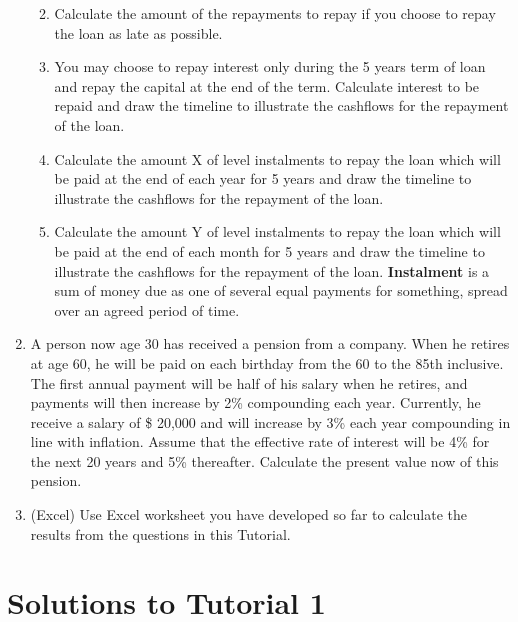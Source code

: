 \documentclass[
]{article}
\theoremstyle{definition}
\theoremstyle{definition}
\theoremstyle{definition}
\theoremstyle{definition}
\theoremstyle{remark}
\begin{document}
\begin{enumerate}
  \begin{enumerate}
  \def\labelenumii{\arabic{enumii}.}
  \item
    Calculate the amount of the repayments to repay if you choose to
    repay the loan as late as possible.
  \item
    You may choose to repay interest only during the 5 years term of
    loan and repay the capital at the end of the term. Calculate
    interest to be repaid and draw the timeline to illustrate the
    cashflows for the repayment of the loan.
  \item
    Calculate the amount X of level instalments to repay the loan
    which will be paid at the end of each year for 5 years and draw
    the timeline to illustrate the cashflows for the repayment of
    the loan.
  \item
    Calculate the amount Y of level instalments to repay the loan
    which will be paid at the end of each month for 5 years and draw
    the timeline to illustrate the cashflows for the repayment of
    the loan. \textbf{Instalment} is a sum of money due as one of several
    equal payments for something, spread over an agreed period of
    time.
  \end{enumerate}
\item
  A person now age 30 has received a pension from a company. When he
  retires at age 60, he will be paid on each birthday from the 60 to
  the 85th inclusive. The first annual payment will be half of his
  salary when he retires, and payments will then increase by 2\%
  compounding each year. Currently, he receive a salary of \$ 20,000
  and will increase by 3\% each year compounding in line with
  inflation. Assume that the effective rate of interest will be 4\% for
  the next 20 years and 5\% thereafter. Calculate the present value now
  of this pension.
\item
  (Excel) Use Excel worksheet you have developed so far to calculate
  the results from the questions in this Tutorial.
\end{enumerate}

\hypertarget{solutions-to-tutorial-1}{%
\section{Solutions to Tutorial 1}\label{solutions-to-tutorial-1}}
\end{document}
